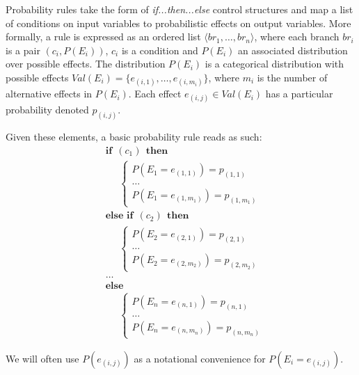 Probability rules take the form of \textit{if...then...else} control structures and map a list of conditions on input variables to probabilistic effects on output variables. More formally, a rule is expressed as an ordered list $\langle br_1, \dots, br_{n}\rangle$, where each branch $br_i$ is a pair $(c_i, P(E_i))$, $c_i$ is a condition and $P(E_i)$ an associated distribution over possible effects.  The distribution $P(E_i)$ is a categorical distribution with possible effects $\textit{Val}(E_i) = \{e_{(i,1)}, \dots, e_{(i,m_i)}\}$, where $m_i$ is the number of alternative effects in $P(E_i)$.  Each effect $e_{(i,j)} \in \textit{Val}(E_i)$ has a particular probability denoted $p_{(i,j)}$. 

Given these elements, a basic probability rule reads as such:
\begin{equation}
\begin{aligned}
& \textbf{if} \ \ (c_{1}) \ \ \textbf{then} \\ 
& \;\;\;\;\; \begin{cases}
P(E_1\!=\!e_{(1,1)}) = p_{(1,1)} \\
 \dots \\
P(E_1\!=\!e_{(1,m_1)}) = p_{(1,m_1)} 
\end{cases} \\[3mm]
& \textbf{else if} \ \ (c_{2}) \ \ \textbf{then} \\ 
& \;\;\;\;\; \begin{cases}
P(E_2\!=\!e_{(2,1)}) = p_{(2,1)} \\
 \dots \\
P(E_2\!=\!e_{(2,m_2)}) = p_{(2,m_2)}
\end{cases} \\ 
& \dots  \\
& \textbf{else} \\
& \;\;\;\;\; \begin{cases}
P(E_{n}\!=\!e_{(n,1)}) = p_{(n,1)} \\
\dots \\
P(E_{n}\!=\!e_{(n,m_n)}) = p_{(n,m_n)}
\end{cases}
\end{aligned}
\label{eq:probrule}
\end{equation}

We will often use $P(e_{(i,j)})$ as a notational convenience for $P(E_i = e_{(i,j)})$.   


